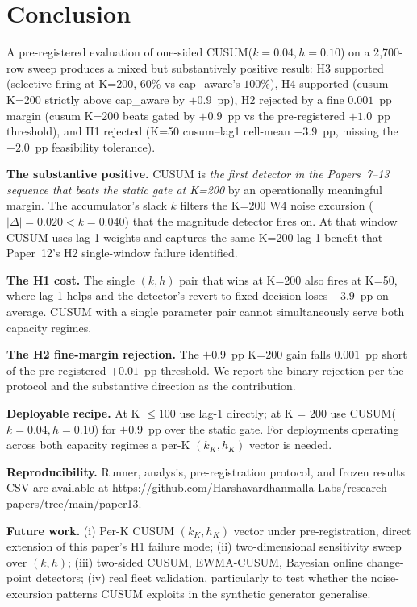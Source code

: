 \section{Conclusion}
\label{sec:conclusion}

A pre-registered evaluation of one-sided CUSUM($k = 0.04, h = 0.10$)
on a 2{,}700-row sweep produces a mixed but substantively positive
result: H3 supported (selective firing at K=200, $60\%$ vs cap\_aware's
$100\%$), H4 supported (cusum K=200 strictly above cap\_aware by
$+0.9$~pp), H2 rejected by a fine $0.001$~pp margin (cusum
K=200 beats gated by $+0.9$~pp vs the pre-registered $+1.0$~pp
threshold), and H1 rejected (K=50 cusum--lag1 cell-mean $-3.9$~pp,
missing the $-2.0$~pp feasibility tolerance).

\textbf{The substantive positive.} CUSUM is \textit{the first detector
in the Papers~7--13 sequence that beats the static gate at K=200} by
an operationally meaningful margin. The accumulator's slack $k$
filters the K=200 W4 noise excursion ($|\Delta| = 0.020 < k = 0.040$)
that the magnitude detector fires on. At that window CUSUM uses
lag-1 weights and captures the same K=200 lag-1 benefit that
Paper~12's H2 single-window failure identified.

\textbf{The H1 cost.} The single $(k, h)$ pair that wins at K=200
also fires at K=50, where lag-1 helps and the detector's revert-to-fixed
decision loses $-3.9$~pp on average. CUSUM with a single parameter
pair cannot simultaneously serve both capacity regimes.

\textbf{The H2 fine-margin rejection.} The $+0.9$~pp K=200 gain
falls $0.001$~pp short of the pre-registered $+0.01$~pp threshold.
We report the binary rejection per the protocol and the substantive
direction as the contribution.

\textbf{Deployable recipe.} At K $\leq 100$ use lag-1 directly; at
K = 200 use CUSUM($k = 0.04, h = 0.10$) for $+0.9$~pp over the
static gate. For deployments operating across both capacity
regimes a per-K $(k_K, h_K)$ vector is needed.

\textbf{Reproducibility.} Runner, analysis, pre-registration protocol,
and frozen results CSV are available at
\url{https://github.com/Harshavardhanmalla-Labs/research-papers/tree/main/paper13}.

\textbf{Future work.} (i) Per-K CUSUM $(k_K, h_K)$ vector under
pre-registration, direct extension of this paper's H1 failure
mode; (ii) two-dimensional sensitivity sweep over $(k, h)$;
(iii) two-sided CUSUM, EWMA-CUSUM, Bayesian online change-point
detectors; (iv) real fleet validation, particularly to test whether
the noise-excursion patterns CUSUM exploits in the synthetic
generator generalise.
